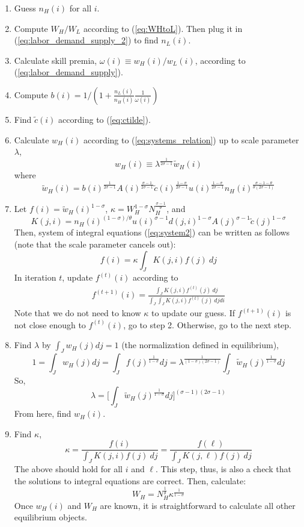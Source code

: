 \documentclass[12 pt]{article}
\begin{document}
\begin{enumerate}
\item Guess $n_H(i)$ for all $i$.
\item Compute $W_H/W_L$ according to (\ref{eq:WHtoL}). Then plug it in (\ref{eq:labor_demand_supply_2}) to find $n_L(i)$.
\item Calculate skill premia, $\omega(i) \equiv w_H(i)/w_L(i)$, according to (\ref{eq:labor_demand_supply}).
\item Compute $b(i)
= 1/(1 + \frac{n_L(i)}{n_H(i)} \frac{1}{\omega(i)})$
\item Find $\tilde{c}(i)$ according to (\ref{eq:ctilde}).
\item Calculate $w_H(i)$ according to (\ref{eq:systems_relation}) up to scale parameter $\lambda$,
\[
w_H(i) \equiv \lambda^{\frac{1}{2\sigma-1}} \tilde{w}_H(i)
\]
where
\[
\tilde{w}_H(i) = b(i)^{\frac{1}{2\sigma-1}} A(i)^{\frac{\sigma-1}{2\sigma-1}}\tilde{c}(i)^{\frac{1-\sigma}{2\sigma-1}} u(i)^{\frac{1-\sigma}{2\sigma-1}} n_H(i)^{\frac{\sigma-1-\theta}{\theta(2\sigma-1)}}
\]
\item Let $f(i)=\tilde{w}_H(i)^{1-\sigma}$, $\kappa=W_H^{1-\sigma} N_H^{\frac{\sigma-1}{\theta}}$, and
\[
K(j,i) = n_H(i)^{(1-\sigma)/\theta}u(i)^{\sigma-1} d(j,i)^{1-\sigma} A(j)^{\sigma-1} \tilde{c}(j)^{1-\sigma}
\]
Then, system of integral equations (\ref{eq:system2}) can be written as follows (note that the scale parameter cancels out):
\[
f(i) = \kappa \int_J K(j,i) f(j)~dj
\]
In iteration $t$, update $f^{(t)}(i)$ according to
\begin{eqnarray}
	f^{(t+1)}(i) = \frac{\int_J K(j,i) f^{(t)}(j)~dj}{\int_J \int_J K(j,i) f^{(t)}(j)~dj di}
\end{eqnarray}
Note that we do not need to know $\kappa$ to update our guess. If $f^{(t+1)}(i)$ is not close enough to $f^{(t)}(i)$, go to step 2. Otherwise, go to the next step. 
\item Find $\lambda$ by $\int_J w_H(j) dj =1$ (the normalization defined in equilibrium),
\[
1=\int_J w_H(j) dj = \int_J f(j)^{\frac{1}{1-\sigma}} dj = \lambda^{\frac{1}{(1-\sigma)(2\sigma-1)}} \int_J \tilde{w}_H(j)^{\frac{1}{1-\sigma}} dj
\]
So,
\[
\lambda = \Big[\int_J \tilde{w}_H(j)^{\frac{1}{1-\sigma}} dj\Big]^{(\sigma-1)(2\sigma-1)}
\]
From here, find $w_H(i)$.
\item Find $\kappa$,
\[
\kappa = \frac{ f(i)} {\int_J K(j,i) f(j)~dj} = \frac{f(\ell)}{\int_J K(j,\ell) f(j)~dj} 
\]
The above should hold for all $i$ and $\ell$. This step, thus, is also a check that the solutions to integral equations are correct. Then, calculate: 
\[
W_H = N_H^{\frac{1}{\theta}}\kappa^{\frac{1}{1-\sigma}}
\]
Once $w_H(i)$ and $W_H$ are known, it is straightforward to calculate all other equilibrium objects.
\end{enumerate}
\end{document}
